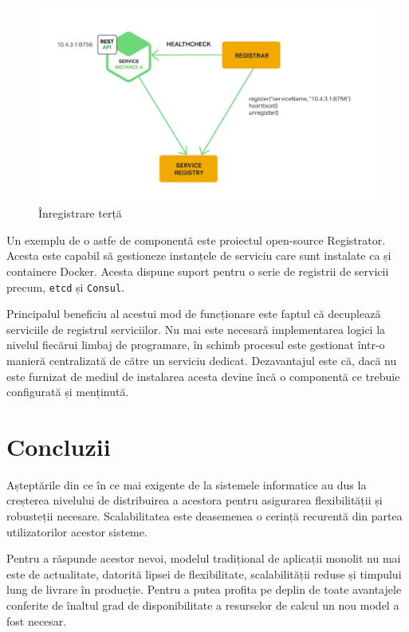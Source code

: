 \documentclass[12pt, a4paper, oneside, romanian]{teza-upb}
\begin{document}
\begin{figure}[ht]
\centering
\includegraphics[scale=0.3]{img/Richardson-microservices-part4-5_third-party-pattern.png}
\caption{Înregistrare terță}
\label{fig:arhi_componente}
\end{figure}

Un exemplu de o astfe de componentă este proiectul open-source Registrator. Acesta este capabil să gestioneze instanțele de serviciu care sunt instalate ca și containere Docker. Acesta dispune suport pentru o serie de registrii de servicii precum, \texttt{etcd} și \texttt{Consul}.

Principalul beneficiu al acestui mod de funcționare este faptul că decuplează serviciile de registrul serviciilor. Nu mai este necesară implementarea logici la nivelul fiecărui limbaj de programare, în schimb procesul este gestionat într-o manieră centralizată de către un serviciu dedicat. Dezavantajul este că, dacă nu este furnizat de mediul de instalarea acesta devine încă o componentă ce trebuie configurată și menținută. 

\chapter{Concluzii}

Așteptările din ce în ce mai exigente de la sistemele informatice au dus la creșterea nivelului de distribuirea a acestora pentru asigurarea flexibilității și robusteții necesare. Scalabilitatea este deasemenea o cerință recurentă din partea utilizatorilor acestor sisteme.

Pentru a răspunde acestor nevoi, modelul tradițional de aplicații monolit nu mai este de actualitate, datorită lipsei de flexibilitate, scalabilității reduse și timpului lung de livrare în producție. Pentru a putea profita pe deplin de toate avantajele conferite de înaltul grad de disponibilitate a resurselor de calcul un nou model a fost necesar. 
\end{document}
